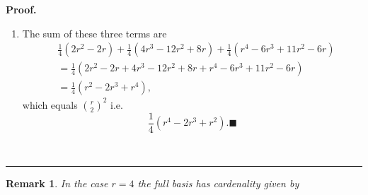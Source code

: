 \documentclass[aps,preprint]{revtex4}%
\newtheorem{remark}[theorem]{Remark}
\newenvironment{proof}[1][Proof]{\noindent\textbf{#1.} }{\ \rule{0.5em}{0.5em}}
\begin{document}
\begin{proof}
\begin{enumerate}
\begin{enumerate}
\item In general%
\begin{align}
\binom{r}{2}\binom{r-2}{2}  &  =\frac{1}{4}\left(  r^{2}-\frac{1}{2}r\right)
\left(  r-2\right)  \left(  r-3\right)  =\frac{1}{4}\left(  r^{2}-r\right)
\left(  r^{2}-5r+6\right) \\
&  =\frac{1}{4}\left(  r^{2}\left(  r^{2}-5r+6\right)  -r\left(
r^{2}-5r+6\right)  \right)  =\frac{1}{4}\left(  r^{4}-5r^{3}+6r^{2}%
-r^{3}+5r^{2}-6r\right) \\
&  =\frac{1}{4}\left(  r^{4}-6r^{3}+11r^{2}-6r\right)
\end{align}


\item In the case $r=4$%
\begin{equation}
\frac{1}{4}4\left(  4^{3}-6\left(  4^{2}\right)  +11\left(  4\right)
-6\right)  =64-96+44-6=108-102=6
\end{equation}

\end{enumerate}

\item The sum of these three terms are
\begin{align}
&  \frac{1}{4}\left(  2r^{2}-2r\right)  +\frac{1}{4}\left(  4r^{3}%
-12r^{2}+8r\right)  +\frac{1}{4}\left(  r^{4}-6r^{3}+11r^{2}-6r\right) \\
&  =\frac{1}{4}\left(  2r^{2}-2r+4r^{3}-12r^{2}+8r+r^{4}-6r^{3}+11r^{2}%
-6r\right) \\
&  =\frac{1}{4}\left(  r^{2}-2r^{3}+r^{4}\right)  ,
\end{align}
which equals $\binom{r}{2}^{2}$ i.e.%
\begin{equation}
\frac{1}{4}\left(  r^{4}-2r^{3}+r^{2}\right)  .\blacksquare
\end{equation}

\end{enumerate}
\end{proof}

\begin{remark}
In the case $r=4$ the full basis has cardenality given by
\end{remark}

%
\end{document}
